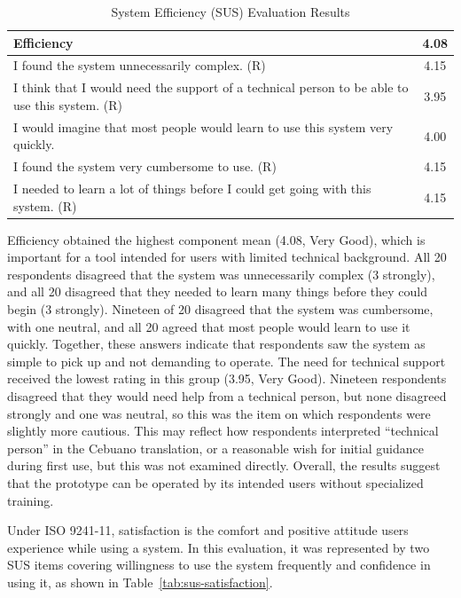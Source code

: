 \begin{thesisprose}
\begin{table}[htbp]
\centering
\caption{System Efficiency (SUS) Evaluation Results}
\label{tab:sus-efficiency}
\begin{tabularx}{\textwidth}{Xc}
\toprule
\textbf{Efficiency} & \textbf{4.08} \\
\midrule
I found the system unnecessarily complex. (R) & 4.15 \\
I think that I would need the support of a technical person to be able to use this system. (R) & 3.95 \\
I would imagine that most people would learn to use this system very quickly. & 4.00 \\
I found the system very cumbersome to use. (R) & 4.15 \\
I needed to learn a lot of things before I could get going with this system. (R) & 4.15 \\
\bottomrule
\end{tabularx}
\end{table}

Efficiency obtained the highest component mean (4.08, Very Good), which is important for a tool intended for users with limited technical background. All 20 respondents disagreed that the system was unnecessarily complex (3 strongly), and all 20 disagreed that they needed to learn many things before they could begin (3 strongly). Nineteen of 20 disagreed that the system was cumbersome, with one neutral, and all 20 agreed that most people would learn to use it quickly. Together, these answers indicate that respondents saw the system as simple to pick up and not demanding to operate. The need for technical support received the lowest rating in this group (3.95, Very Good). Nineteen respondents disagreed that they would need help from a technical person, but none disagreed strongly and one was neutral, so this was the item on which respondents were slightly more cautious. This may reflect how respondents interpreted ``technical person'' in the Cebuano translation, or a reasonable wish for initial guidance during first use, but this was not examined directly. Overall, the results suggest that the prototype can be operated by its intended users without specialized training.

Under ISO 9241-11, satisfaction is the comfort and positive attitude users experience while using a system. In this evaluation, it was represented by two SUS items covering willingness to use the system frequently and confidence in using it, as shown in Table~\ref{tab:sus-satisfaction}.


\end{thesisprose}
